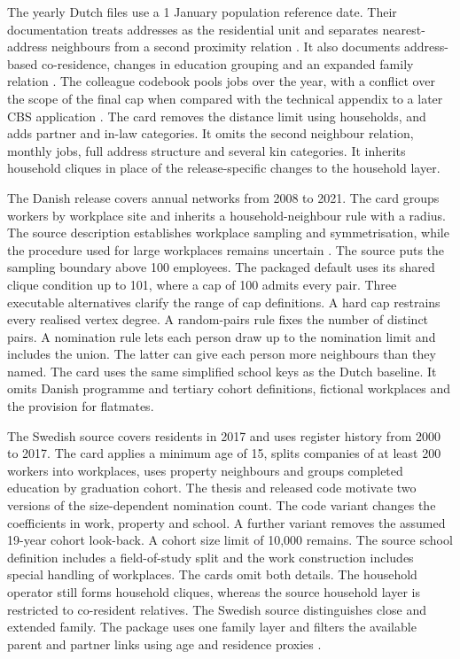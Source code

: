 The yearly Dutch files use a 1 January population reference date. Their documentation treats addresses as the residential unit and separates nearest-address neighbours from a second proximity relation \citep{cbs2023,das2023,catbur}. It also documents address-based co-residence, changes in education grouping and an expanded family relation \citep{cathui,catkla,catfam}. The colleague codebook pools jobs over the year, with a conflict over the scope of the final cap when compared with the technical appendix to a later CBS application \citep{catcol,vanklingeren2024}. The card removes the distance limit using households, and adds partner and in-law categories. It omits the second neighbour relation, monthly jobs, full address structure and several kin categories. It inherits household cliques in place of the release-specific changes to the household layer.

The Danish release covers annual networks from 2008 to 2021. The card groups workers by workplace site and inherits a household-neighbour rule with a radius. The source description establishes workplace sampling and symmetrisation, while the procedure used for large workplaces remains uncertain \citep{cremers2025}. The source puts the sampling boundary above 100 employees. The packaged default uses its shared clique condition up to 101, where a cap of 100 admits every pair. Three executable alternatives clarify the range of cap definitions. A hard cap restrains every realised vertex degree. A random-pairs rule fixes the number of distinct pairs. A nomination rule lets each person draw up to the nomination limit and includes the union. The latter can give each person more neighbours than they named. The card uses the same simplified school keys as the Dutch baseline. It omits Danish programme and tertiary cohort definitions, fictional workplaces and the provision for flatmates.

The Swedish source covers residents in 2017 and uses register history from 2000 to 2017. The card applies a minimum age of 15, splits companies of at least 200 workers into workplaces, uses property neighbours and groups completed education by graduation cohort. The thesis and released code motivate two versions of the size-dependent nomination count. The code variant changes the coefficients in work, property and school. A further variant removes the assumed 19-year cohort look-back. A cohort size limit of 10,000 remains. The source school definition includes a field-of-study split and the work construction includes special handling of workplaces. The cards omit both details. The household operator still forms household cliques, whereas the source household layer is restricted to co-resident relatives. The Swedish source distinguishes close and extended family. The package uses one family layer and filters the available parent and partner links using age and residence proxies \citep{panayiotou2025,wohlert2024,secode2026}.

